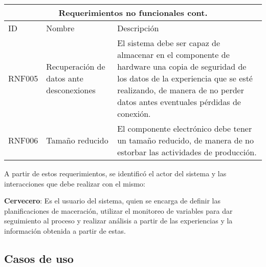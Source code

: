     
    \begin{minipage}{0.95\textwidth}
    \begin{center}
    \begin{tabularx}{\textwidth}{| X | X | X |}
    \hline
    \multicolumn{3}{|c|}{\textbf{Requerimientos no funcionales cont.}} \\
    \hline
    ID & Nombre & Descripción \\
    \hline
    \hline     
        RNF005 & Recuperación de datos ante desconexiones & El sistema debe ser capaz de almacenar en el componente de hardware una copia de seguridad de los datos de la experiencia que se esté realizando, de manera de no perder datos antes eventuales pérdidas de conexión.
        \\ \hline
        RNF006 & Tamaño reducido & El componente electrónico debe tener un tamaño reducido, de manera de no estorbar las actividades de producción.
         \\\hline
    \end{tabularx}
    \label{ReqNoFuncionales_Parte2}
    \end{center}
    \end{minipage}
    
    \begin{minipage}{0.95\textwidth}
    \par
    A partir de estos requerimientos, se identificó el actor del sistema y las
    interacciones que debe realizar con el mismo:
    \par
    \textbf{Cervecero}: Es el usuario del sistema, quien se encarga de definir las planificaciones de maceración, utilizar el monitoreo de variables para dar seguimiento al proceso y realizar análisis a partir de las experiencias y la información obtenida a partir de estas.
    \end{minipage}
 
 
    
    \subsection{Casos de uso}
 

